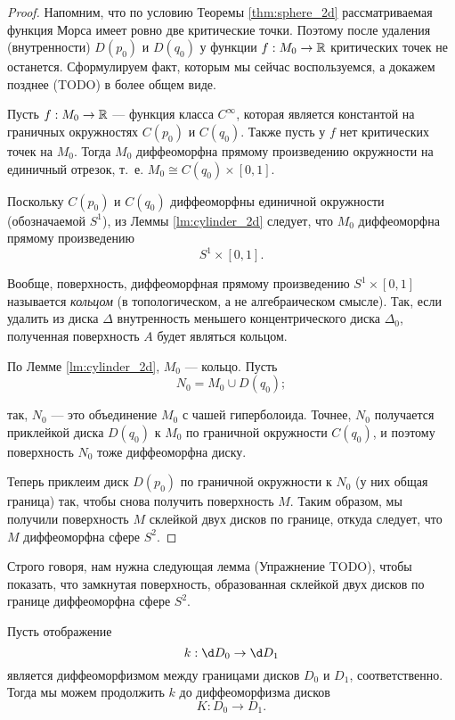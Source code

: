 \documentclass[a4paper,12pt,openany,leqno]{extbook}
\begin{document}
\begin{proof}
Напомним, что по условию Теоремы \ref{thm:sphere_2d} рассматриваемая функция Морса имеет ровно две критические точки. Поэтому после удаления (внутренности) $D(p_0)$ и $D(q_0)$ у функции $f: M_0 \to \mathbb{R}$ критических точек не останется. Сформулируем факт, которым мы сейчас воспользуемся, а докажем позднее (TODO) в более общем виде.

\begin{lemma}
Пусть $f: M_0 \to \mathbb{R}$ --- функция класса $C^{\infty}$, которая является константой на граничных окружностях $C(p_0)$ и $C(q_0)$. Также пусть у $f$ нет критических точек на $M_0$. Тогда $M_0$ диффеоморфна прямому произведению окружности на единичный отрезок, т.~е. $M_0 \cong C(q_0) \times [0, 1]$.
\label{lm:cylinder_2d}
\end{lemma}

Поскольку $C(p_0)$ и $C(q_0)$ диффеоморфны единичной окружности (обозначаемой $S^1$), из Леммы \ref{lm:cylinder_2d} следует, что $M_0$ диффеоморфна прямому произведению
\[
S^1 \times [0, 1].
\]

Вообще, поверхность, диффеоморфная прямому произведению $S^1 \times [0, 1]$ называется \emph{кольцом} (в топологическом, а не алгебраическом смысле). Так, если удалить из диска $\Delta$ внутренность меньшего концентрического диска $\Delta_0$, полученная поверхность $A$ будет являться кольцом.

По Лемме \ref{lm:cylinder_2d}, $M_0$ --- кольцо. Пусть
\[
N_0 = M_0 \cup D(q_0);
\]

так, $N_0$ --- это объединение $M_0$ с чашей гиперболоида. Точнее, $N_0$ получается приклейкой диска $D(q_0)$ к $M_0$ по граничной окружности $C(q_0)$, и поэтому поверхность $N_0$ тоже диффеоморфна диску.

Теперь приклеим диск $D(p_0)$ по граничной окружности к $N_0$ (у них общая граница) так, чтобы снова получить поверхность $M$. Таким образом, мы получили поверхность $M$ склейкой двух дисков по границе, откуда следует, что $M$ диффеоморфна сфере $S^2$.
\end{proof}

Строго говоря, нам нужна следующая лемма (Упражнение TODO), чтобы показать, что замкнутая поверхность, образованная склейкой двух дисков по границе диффеоморфна сфере $S^2$.

\begin{lemma}
Пусть отображение
\begin{equation}
k: \d D_0 \to \d D_1
\end{equation}
является диффеоморфизмом между границами дисков $D_0$ и $D_1$, соответственно. Тогда мы можем продолжить $k$ до диффеоморфизма дисков
\begin{equation}
K:D_0 \to D_1.
\end{equation}
\label{lm:diff_extension_disk}
\end{lemma}
\end{document}

